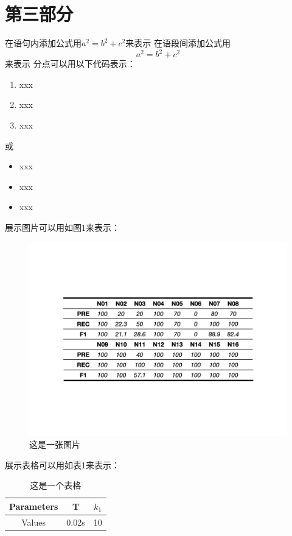 \documentclass[12pt]{article}
\begin{document}
\section{\songti{}第三部分}
\clearpage
\songti{}在语句内添加公式用$a^2=b^2+c^2$来表示
\songti{}在语段间添加公式用$$a^2=b^2+c^2$$来表示
\clearpage
\songti{}分点可以用以下代码表示：
\begin{enumerate}
    \songti{}\item xxx
    \songti{}\item xxx
    \songti{}\item xxx
\end{enumerate}
或
\begin{itemize}
    \songti{}\item xxx
    \songti{}\item xxx
    \songti{}\item xxx
\end{itemize}
\clearpage
\songti{}展示图片可以用如图1来表示：
\begin{figure}[H]
    \label{fig:图片}
    \centering
    \includegraphics[scale=0.5,trim=150 220 150 220,clip]{图片.jpeg}
    \caption{\fangsong 这是一张图片}
\end{figure}
\clearpage
\songti{}展示表格可以用如表1来表示：
\begin{table}[H]
    \centering
    \begin{tabular}{ccc}
        \hline
        Parameters & T & $k_1$ \\ 
        \hline
        Values & 0.02s & 10 \\ 
        \hline
    \end{tabular}
    \caption{\fangsong 这是一个表格}
\end{table}
\end{document}
